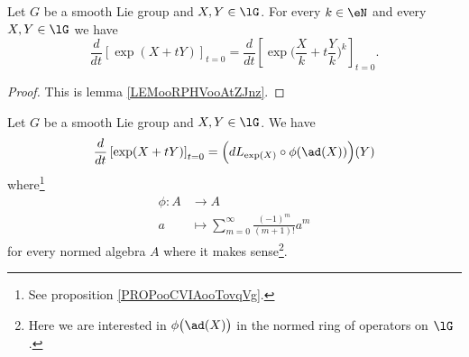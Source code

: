 \begin{proposition}	\label{PROPooYCGFooYPJjfg}
	Let \( G\) be a smooth Lie group and \( X,Y\in\lG\). For every \( k\in \eN\) and every \( X,Y\in \lG\) we have
	\begin{equation}
		\frac{d}{dt} \left[ \exp(X+tY)  \right]_{t=0}=\frac{d}{dt} \left[ \exp\big( \frac{ X }{ k }+t\frac{ Y }{ k } \big)^k  \right]_{t=0}.
	\end{equation}
\end{proposition}

\begin{proof}
	This is lemma \ref{LEMooRPHVooAtZJnz}.
\end{proof}

\begin{lemma}	\label{LEMooTXNVooYmZDOl}
	Let \( G\) be a smooth Lie group and \( X,Y\in\lG\). We have
	\begin{equation}
		\frac{d}{dt} \left[ \exp(X+tY)  \right]_{t=0}=\Big( dL_{\exp(X)}\circ\phi(\ad(X)) \Big)(Y)
	\end{equation}
	where\footnote{See proposition \ref{PROPooCVIAooTovqVg}.}
	\begin{equation}
		\begin{aligned}
			\phi\colon A & \to A                                                   \\
			a            & \mapsto \sum_{m=0}^{\infty}\frac{ (-1)^m }{ (m+1)! }a^m
		\end{aligned}
	\end{equation}
	for every normed algebra \( A\) where it makes sense\footnote{Here we are interested in \( \phi\big(\ad(X)\big)\) in the normed ring of operators on \( \lG\).}.
\end{lemma}

